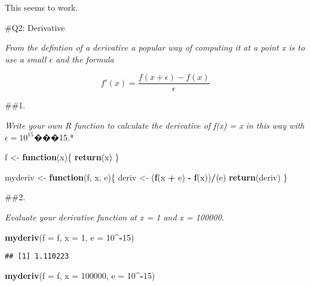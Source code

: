 \documentclass[]{article}
\newenvironment{Shaded}{\begin{snugshade}}{\end{snugshade}}
\newcommand{\ControlFlowTok}[1]{\textcolor[rgb]{0.13,0.29,0.53}{\textbf{#1}}}
\newcommand{\DataTypeTok}[1]{\textcolor[rgb]{0.13,0.29,0.53}{#1}}
\newcommand{\DecValTok}[1]{\textcolor[rgb]{0.00,0.00,0.81}{#1}}
\newcommand{\KeywordTok}[1]{\textcolor[rgb]{0.13,0.29,0.53}{\textbf{#1}}}
\newcommand{\NormalTok}[1]{#1}
\newcommand{\OperatorTok}[1]{\textcolor[rgb]{0.81,0.36,0.00}{\textbf{#1}}}
\newcommand{\StringTok}[1]{\textcolor[rgb]{0.31,0.60,0.02}{#1}}
\begin{document}
This seems to work.

\newpage

\#Q2: Derivative

\emph{From the defintion of a derivative a popular way of computing it
at a point x is to use a small \(\epsilon\) and the formula}

\[f'(x) = \frac{f(x + \epsilon) - f(x)}{\epsilon}\]

\#\#1.

\emph{Write your own R function to calculate the derivative of f(x) = x
in this way with \(\epsilon = 10^{15}\)}���15.*

\begin{Shaded}
\begin{Highlighting}[]
\NormalTok{f <-}\StringTok{ }\ControlFlowTok{function}\NormalTok{(x)\{}
  \KeywordTok{return}\NormalTok{(x)}
\NormalTok{\}}

\NormalTok{myderiv <-}\StringTok{ }\ControlFlowTok{function}\NormalTok{(f, x, e)\{}
\NormalTok{  deriv <-}\StringTok{ }\NormalTok{(}\KeywordTok{f}\NormalTok{(x }\OperatorTok{+}\StringTok{ }\NormalTok{e) }\OperatorTok{-}\StringTok{ }\KeywordTok{f}\NormalTok{(x))}\OperatorTok{/}\NormalTok{(e)}
  \KeywordTok{return}\NormalTok{(deriv)}
\NormalTok{\}}
\end{Highlighting}
\end{Shaded}

\#\#2.

\emph{Evaluate your derivative function at x = 1 and x = 100000.}

\begin{Shaded}
\begin{Highlighting}[]
\KeywordTok{myderiv}\NormalTok{(}\DataTypeTok{f =}\NormalTok{ f, }\DataTypeTok{x =} \DecValTok{1}\NormalTok{, }\DataTypeTok{e =} \DecValTok{10}\OperatorTok{^-}\DecValTok{15}\NormalTok{)}
\end{Highlighting}
\end{Shaded}

\begin{verbatim}
## [1] 1.110223
\end{verbatim}

\begin{Shaded}
\begin{Highlighting}[]
\KeywordTok{myderiv}\NormalTok{(}\DataTypeTok{f =}\NormalTok{ f, }\DataTypeTok{x =} \DecValTok{100000}\NormalTok{, }\DataTypeTok{e =} \DecValTok{10}\OperatorTok{^-}\DecValTok{15}\NormalTok{)}
\end{Highlighting}
\end{Shaded}
\end{document}
